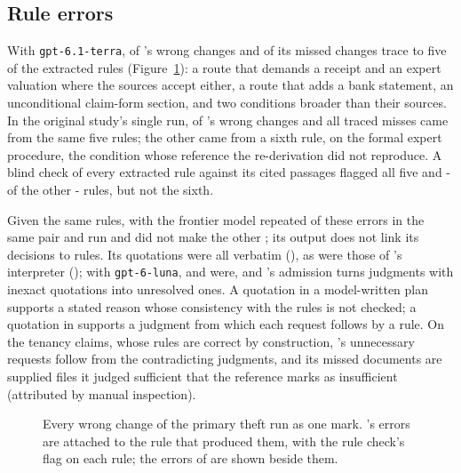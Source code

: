 \subsection{Rule errors}
\label{sec:results-rules}

With \texttt{gpt-6.1-terra}, \ecWrongFaulty{} of \casepath's \thTerraCPWrong{} wrong changes and \ecMissedFaulty{} of its \thTerraCPMissed{} missed changes trace to five of the \rvRules{} extracted rules (Figure~\ref{fig:trace}): a route that demands a receipt and an expert valuation where the sources accept either, a route that adds a bank statement, an unconditional claim-form section, and two conditions broader than their sources. In the original study's single run, \origTraceWrongFive{} of \casepath's \origTraceWrong{} wrong changes and all \origTraceMissed{} traced misses came from the same five rules; the other \origTraceWrongRuleTwentyThree{} came from a sixth rule, on the formal expert procedure, the condition whose reference the re-derivation did not reproduce. A blind check of every extracted rule against its cited passages flagged all five and \the\numexpr\rvFlagged-\rvImplicatedFlagged\relax{} of the other \the\numexpr\rvRules-\rvImplicated\relax{} rules, but not the sixth.

Given the same rules,  with the frontier model repeated \ecFaultyAlsoR{} of these \ecWrongFaulty{} errors in the same pair and run and did not make the other \ecFaultyAvoidedR; its output does not link its decisions to rules. Its quotations were all verbatim (\citBone), as were those of \casepath's interpreter (\citCPProp); with \texttt{gpt-6-luna}, \pct{\citLunaBoneExact} and \pct{\citLunaCPPropExact} were, and \casepath's admission turns judgments with inexact quotations into unresolved ones. A quotation in a model-written plan supports a stated reason whose consistency with the rules is not checked; a quotation in \casepath supports a judgment from which each request follows by a rule. On the tenancy claims, whose rules are correct by construction, \casepath's \tenTerraCPxFP{} unnecessary requests follow from the \jaFlipped{} contradicting judgments, and its \tenTerraCPxMissN{} missed documents are supplied files it judged sufficient that the reference marks as insufficient (attributed by manual inspection).

\begin{figure}[t]
\centering
{}
\caption{Every wrong change of the primary theft run as one mark. \casepath's errors are attached to the rule that produced them, with the rule check's flag on each rule; the errors of  are shown beside them.}
\label{fig:trace}
\end{figure}

